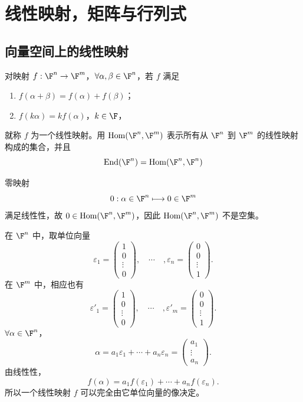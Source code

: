 \setchapterintro{}
\chapter{线性映射，矩阵与行列式}
\section{向量空间上的线性映射}

\begin{definition}\label{p1:concept:c3-l7}
	对映射 $f:\F^n\to\F^m$，$\forall\alpha,\beta\in\F^n$，若 $f$ 满足
	\begin{enumerate}
		\item $f(\alpha+\beta)=f(\alpha)+f(\beta)$；
		\item $f(k\alpha)=k f(\alpha)$，$k\in\F$，
	\end{enumerate}
	就称 $f$ 为一个线性映射。用 $\operatorname{Hom}(\F^n,\F^m)$ 表示所有从 $\F^n$ 到 $\F^m$ 的线性映射构成的集合，并且
	\[
	\operatorname{End}(\F^n)=\operatorname{Hom}(\F^n,\F^n)
	\]
	
	零映射
	\[
	0:\alpha\in\F^n\longmapsto 0\in\F^m
	\]
	满足线性性，故 $0\in\operatorname{Hom}(\F^n,\F^m)$，因此 $\operatorname{Hom}(\F^n,\F^m)$ 不是空集。
	

\end{definition}
	在 $\F^n$ 中，取单位向量
\[
\varepsilon_1=\begin{pmatrix}1\\0\\\vdots\\0\end{pmatrix},
\quad \cdots \quad,
\varepsilon_n=\begin{pmatrix}0\\0\\\vdots\\1\end{pmatrix}.
\]
在 $\F^m$ 中，相应也有
\[
\varepsilon'_1=\begin{pmatrix}1\\0\\\vdots\\0\end{pmatrix},
\quad \cdots \quad,
\varepsilon'_m=\begin{pmatrix}0\\0\\\vdots\\1\end{pmatrix}.
\]
$\forall\alpha\in\F^n$，
\[
\alpha=a_1\varepsilon_1+\cdots+a_n\varepsilon_n
=\begin{pmatrix}a_1\\\vdots\\a_n\end{pmatrix}.
\]
由线性性，
\[
f(\alpha)=a_1f(\varepsilon_1)+\cdots+a_nf(\varepsilon_n).
\]
所以一个线性映射 $f$ 可以完全由它单位向量的像决定。

